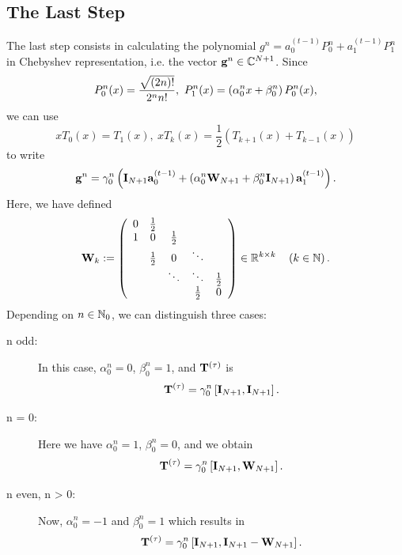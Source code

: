 \subsection{The Last Step}
\label{NFSFT:LinearAlgebra:LastStep}
The last step consists in calculating the polynomial $g^{n} = a_{0}^{(t-1)} P_{0}^{n} + a_{1}^{(t-1)} P_{1}^{n}$ in 
Chebyshev representation, i.e. the vector $\mathbf{g}^{n} \in \mathbb{C}^{N+1}$. Since 
\[
  \fun{P_{0}^n}{x} = \frac{\sqrt{(2n)!}}{2^n n!},\ \fun{P_{1}^n}{x} = \left(\alpha_{0}^n x + \beta_{0}^n\right)P_{0}^n(x),
\] 
we can use 
\[
  xT_{0}(x) = T_{1}(x),\ xT_{k}(x) = \frac{1}{2}\left( T_{k+1}(x) + T_{k-1}(x) \right)
\] 
to write
\[ 
  \mathbf{g}^{n} = \gamma_{0}^n \left( \mathbf{I}_{N+1} \mathbf{a}_{0}^{(t-1)} + \left( \alpha_{0}^n\mathbf{W}_{N+1} + \beta_{0}^n\mathbf{I}_{N+1} \right) 
  \mathbf{a}_{1}^{(t-1)} \right).
\]
Here, we have defined
\[
\mathbf{W}_{k} :=
\left(
\begin{array}{ccccccc}
  0 & \frac{1}{2} &             &                           \\
  1 &           0 & \frac{1}{2} &                           \\
    & \frac{1}{2} &           0 & \ddots                    \\
    &             &      \ddots & \ddots      & \frac{1}{2} \\
    &             &             & \frac{1}{2} &           0
\end{array}
\right)
\in \mathbb{R}^{k \times k} \quad \left(k \in \mathbb{N}\right).
\]
Depending on $n \in \mathbb{N}_{0}$, we can distinguish three cases:
\begin{description}
  \item[n odd:] In this case, $\alpha_{0}^n = 0$, $\beta_{0}^n = 1$, and $\mathbf{T}^{(\tau)}$ is 
    \[
      \mathbf{T}^{(\tau)} = \gamma_{0}^n \left[ \mathbf{I}_{N+1}, \mathbf{I}_{N+1} \right].
    \]
  \item[n = 0:] Here we have $\alpha_{0}^n = 1$, $\beta_{0}^n = 0$, and we obtain \[\mathbf{T}^{(\tau)} = \gamma_{0}^n \left[ \mathbf{I}_{N+1}, \mathbf{W}_{N+1} \right].\]
  \item[n even, n > 0:] Now, $\alpha_{0}^n = -1$ and $\beta_{0}^n = 1$ which results in \[\mathbf{T}^{(\tau)} = \gamma_{0}^n \left[ \mathbf{I}_{N+1}, \mathbf{I}_{N+1} - \mathbf{W}_{N+1} \right].\]
\end{description}

